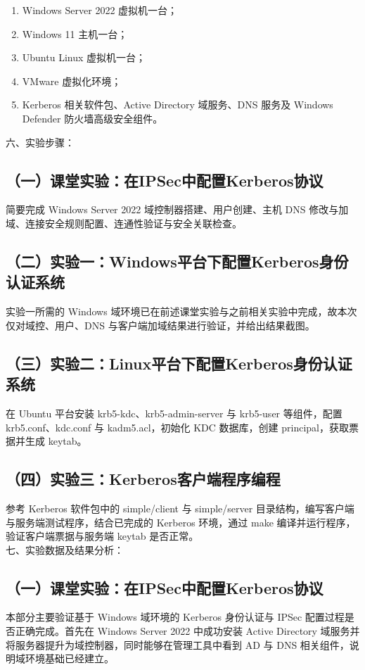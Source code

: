 ﻿\documentclass[12pt]{ctexart}
\newcommand{\blankline}{\vspace{1.5em}}
\begin{document}
\begin{enumerate}
    \item Windows Server 2022 虚拟机一台；
    \item Windows 11 主机一台；
    \item Ubuntu Linux 虚拟机一台；
    \item VMware 虚拟化环境；
    \item Kerberos 相关软件包、Active Directory 域服务、DNS 服务及 Windows Defender 防火墙高级安全组件。
\end{enumerate}

\blankline
{\heiti{} 六、实验步骤：}

\subsection*{（一）课堂实验：在IPSec中配置Kerberos协议}
简要完成 Windows Server 2022 域控制器搭建、用户创建、主机 DNS 修改与加域、连接安全规则配置、连通性验证与安全关联检查。

\subsection*{（二）实验一：Windows平台下配置Kerberos身份认证系统}
实验一所需的 Windows 域环境已在前述课堂实验与之前相关实验中完成，故本次仅对域控、用户、DNS 与客户端加域结果进行验证，并给出结果截图。

\subsection*{（三）实验二：Linux平台下配置Kerberos身份认证系统}
在 Ubuntu 平台安装 krb5-kdc、krb5-admin-server 与 krb5-user 等组件，配置 krb5.conf、kdc.conf 与 kadm5.acl，初始化 KDC 数据库，创建 principal，获取票据并生成 keytab。

\subsection*{（四）实验三：Kerberos客户端程序编程}
参考 Kerberos 软件包中的 simple/client 与 simple/server 目录结构，编写客户端与服务端测试程序，结合已完成的 Kerberos 环境，通过 make 编译并运行程序，验证客户端票据与服务端 keytab 是否正常。
\\
{\heiti{} 七、实验数据及结果分析：}

\subsection*{（一）课堂实验：在IPSec中配置Kerberos协议}
本部分主要验证基于 Windows 域环境的 Kerberos 身份认证与 IPSec 配置过程是否正确完成。首先在 Windows Server 2022 中成功安装 Active Directory 域服务并将服务器提升为域控制器，同时能够在管理工具中看到 AD 与 DNS 相关组件，说明域环境基础已经建立。
\end{document}

